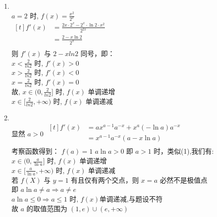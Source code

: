 \documentclass[class=ctexart,crop=false]{standalone}
\begin{document}
\begin{enumerate}[label=(\arabic*)]
	\item \quad\\
	      $a=2$ 时, $f(x)=\frac{x^2}{2^x}$\\
	      $\begin{aligned}[t]
			      f'(x) & =\frac{2x \cdot2^x-2^x\cdot \ln{2}\cdot x^2}{2^{2x}} \\
			            & =\frac{2-x\ln{2}}{2^{x}}                             \\
		      \end{aligned}$\\
	      则 $f'(x)$ 与 $2-xln2$ 同号，即：\\
	      $x<\frac{2}{ln2}$ 时, $f'(x)>0$\\
	      $x>\frac{2}{ln2}$ 时, $f'(x)<0$\\
	      $x=\frac{2}{ln2}$ 时, $f'(x)=0$\\
	      故, $x \in (0,\frac{2}{ln2}]$ 时, $f(x)$ 单调递增\\
	      $x \in [\frac{2}{ln2},+\infty)$ 时, $f(x)$ 单调递减\\
	\item \quad\\
显然 $a>0$
$\begin{aligned}[t]
		f'(x) & =ax^{a-1}a^{-x}+x^a(-\ln{a})a^{-x} \\
		      & =x^{a-1}a^{-x}(a-x\ln{a})          \\
	\end{aligned}$\\
考察函数得到： $f(a)=1$
$a\ln{a}>0$ 即 $a>1$ 时，类似(1),我们有:\\
	      $x \in (0,\frac{a}{\ln{a}}]$ 时, $f(x)$ 单调递增\\
$x \in [\frac{a}{\ln{a}},+\infty)$ 时, $f(x)$ 单调递减\\
	      若 $f(X)$ 与 $y=1$ 有且仅有两个交点，则 $x=a$ 必然不是极值点\\
即 $a\ln{a} \neq a \Rightarrow a \neq e$\\
$a\ln{a} \leqslant 0 \Rightarrow a \leqslant 1$ 时,
$f(x)$单调递减,与题设不符\\
故 $a$ 的取值范围为 $(1,e)\cup (e,+\infty)$
\end{enumerate}
\end{document}
